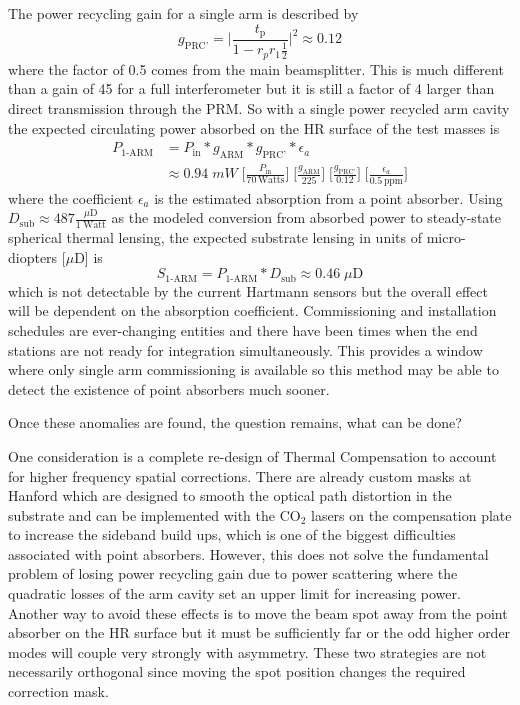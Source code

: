 	The power recycling gain for a single arm is described by
	\begin{equation}
	g_{\text{PRC'}} = \bigg\vert \frac{t_{\text{p}}}{1-r_p r_1 \frac{1}{2}} \bigg\vert^2 \approx 0.12
	\end{equation}
	where the factor of 0.5 comes from the main beamsplitter.  This is much different than a gain of 45 for a full interferometer but it is still a factor of 4 larger than direct transmission through the PRM. So with a single power recycled arm cavity the expected circulating power absorbed on the HR surface of the test masses is
	\begin{equation}
	\begin{aligned}
	P_\text{1-ARM} 	&= P_{\text{in}} * g_{\text{ARM}}  * g_{\text{PRC'}} * \epsilon_a \\
					&\approx 0.94 \; mW \; \bigg[\frac{P_{\text{in}}}{70 \, \text{Watts}}\bigg] \; \bigg[\frac{g_{\text{ARM}}}{ 225 }\bigg] \;  \bigg[\frac{g_{\text{PRC'}}}{ 0.12 }\bigg] \; \bigg[\frac{\epsilon_a}{0.5 \, \text{ppm}}\bigg]
	\end{aligned}
	\end{equation}
	where the coefficient $\epsilon_a$ is the estimated absorption from a point absorber.  Using $ D_{\text{sub}} \approx 487 \frac{\mu \text{D}}{1 \; \text{Watt}}$ as the modeled conversion from absorbed power to steady-state spherical thermal lensing, the expected substrate lensing in units of micro-diopters [$\mu \text{D}$] is
	\begin{equation}
	S_\text{1-ARM} = P_\text{1-ARM} *  D_{\text{sub}} \approx 0.46 \; \mu\text{D}
	\end{equation}
	 which is not detectable by the current Hartmann sensors but the overall effect will be dependent on the absorption coefficient. Commissioning and installation schedules are ever-changing entities and there have been times when the end stations are not ready for integration simultaneously. This provides a window where only single arm commissioning is available so this method may be able to detect the existence of point absorbers much sooner.
	 
	 \indent Once these anomalies are found, the question remains, what can be done?
	 
	 One consideration is a complete re-design of Thermal Compensation to account for higher frequency spatial corrections. There are already custom masks at Hanford which are designed to smooth the optical path distortion in the substrate and can be implemented with the CO$_2$ lasers on the compensation plate to increase the sideband build ups, which is one of the biggest difficulties associated with point absorbers.  However, this does not solve the fundamental problem of losing power recycling gain due to power scattering where the quadratic losses of the arm cavity set an upper limit for increasing power.  Another way to avoid these effects is to move the beam spot away from the point absorber on the HR surface but it must be sufficiently far or the odd higher order modes will couple very strongly with asymmetry. These two strategies are not necessarily orthogonal since moving the spot position changes the required correction mask.
	 
